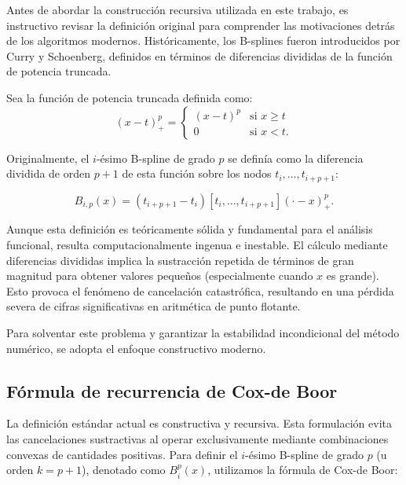 Antes de abordar la construcción recursiva utilizada en este trabajo, es instructivo revisar la definición original para comprender las motivaciones detrás de los algoritmos modernos. Históricamente, los B-splines fueron introducidos por Curry y Schoenberg, definidos en términos de diferencias divididas de la función de potencia truncada.

Sea la función de potencia truncada definida como:
\[ (x-t)^p_+ = \begin{cases}(x-t)^p & \text{si } x \geq t \\ 0 & \text{si } x < t. \end{cases} \]

Originalmente, el \( i \)-ésimo B-spline de grado \( p \) se definía como la diferencia dividida de orden \( p+1 \) de esta función sobre los nodos \( t_i, \dots, t_{i+p+1} \):

\[ B_{i,p}(x) = (t_{i+p+1} - t_i)[t_i, \dots, t_{i+p+1}](\cdot - x)^p_+. \]

Aunque esta definición es teóricamente sólida y fundamental para el análisis funcional, resulta computacionalmente ingenua e inestable. El cálculo mediante diferencias divididas implica la sustracción repetida de términos de gran magnitud para obtener valores pequeños (especialmente cuando \( x \) es grande). Esto provoca el fenómeno de cancelación catastrófica, resultando en una pérdida severa de cifras significativas en aritmética de punto flotante.

Para solventar este problema y garantizar la estabilidad incondicional del método numérico, se adopta el enfoque constructivo moderno.

\subsection{Fórmula de recurrencia de Cox-de Boor}


La definición estándar actual es constructiva y recursiva. Esta formulación evita las cancelaciones sustractivas al operar exclusivamente mediante combinaciones convexas de cantidades positivas. Para definir el \( i \)-ésimo B-spline de grado \( p \) (u orden \( k = p+1 \)), denotado como \( B_i^p(x) \), utilizamos la fórmula de Cox-de Boor:

